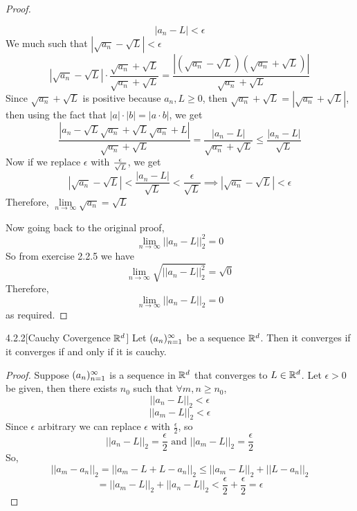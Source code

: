 \documentclass[openany]{report}
\begin{document}
\begin{proof}
\begin{itemize}
        \[|a_n - L| < \epsilon\]
        We much such that $|\sqrt{a_n} - \sqrt{L}| < \epsilon$
        \[|\sqrt{a_n} - \sqrt{L}| \cdot \frac{\sqrt{a_n} + \sqrt{L}}{\sqrt{a_n} + \sqrt{L}} = \frac{|(\sqrt{a_n} - \sqrt{L})(\sqrt{a_n} + \sqrt{L})|}{\sqrt{a_n} + \sqrt{L}}\]
        Since $\sqrt{a_n} + \sqrt{L}$ is positive because $a_n, L \geq 0$, then $\sqrt{a_n} + \sqrt{L} = |\sqrt{a_n} + \sqrt{L}|$, then using the fact that $|a|\cdot|b| = |a\cdot b|$, we get 
        \[\frac{|a_n - \sqrt{L}\sqrt{a_n} + \sqrt{L}\sqrt{a_n} + L|}{\sqrt{a_n} + \sqrt{L}} = \frac{|a_n - L|}{\sqrt{a_n} + \sqrt{L}} \leq \frac{|a_n - L|}{\sqrt{L}}\]
        Now if we replace $\epsilon$ with $\epsilon \over \sqrt{L}$, we get 
        \[|\sqrt{a_n} - \sqrt{L}| < \frac{|a_n - L|}{\sqrt{L}} < \frac{\epsilon}{\sqrt{L}} \implies |\sqrt{a_n} - \sqrt{L}| < \epsilon\]
        Therefore, $\lim\limits_{n\rightarrow\infty}\sqrt{a_n} = \sqrt{L}$
    \end{itemize}
    Now going back to the original proof, 
    \[\lim_{n\rightarrow \infty} ||a_n - L||_2^2 = 0\]
    So from exercise 2.2.5 we have
    \[\lim_{n\rightarrow \infty} \sqrt{||a_n - L||^2_2} = \sqrt{0}\]
    Therefore,
    \[\lim_{n \rightarrow \infty} ||a_n - L||_2 = 0\]
    as required.
\end{proof}

\begin{manualtheorem}{4.2.2}[Cauchy Covergence $\mathbb{R}^d$]
    Let $({a}_n)_{n=1}^\infty$ be a sequence $\mathbb{R}^d$. Then it converges if it converges if and only if it is cauchy.
\end{manualtheorem}
\begin{proof}
    Suppose $({a}_n)_{n=1}^\infty$ is a sequence in $\mathbb{R}^d$ that converges to $L \in \mathbb{R}^d$. Let $\epsilon > 0$ be given, then there exists $n_0$ such that $\forall m,n \geq n_0$,
    \[||a_n - L||_2 < \epsilon\]
    \[||a_m - L||_2 < \epsilon\]
    Since $\epsilon$ arbitrary we can replace $\epsilon$ with $\frac{\epsilon}{2}$, so 
    \[||a_n-L||_2 = \frac{\epsilon}{2} \text{ and } ||a_m - L||_2 = \frac{\epsilon}{2}\]
    So,
    \[||a_m - a_n||_2 = ||a_m - L + L - a_n||_2 \leq ||a_m - L||_2 + ||L - a_n||_2\]
    \[= ||a_m - L||_2  + ||a_n - L||_2 < \frac{\epsilon}{2} +  \frac{\epsilon}{2} = \epsilon\]
\end{proof}
\end{document}
